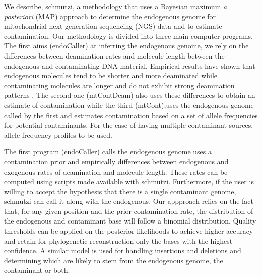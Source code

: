 \documentclass[a4paper,12pt]{article}
\begin{document}

We describe, schmutzi, a methodology that uses a Bayesian maximum {\it a posteriori} (MAP) approach to determine the endogenous genome for mitochondrial next-generation sequencing (NGS) data and to estimate contamination. Our methodology is divided into three main computer programs. The first aims (endoCaller) at inferring the endogenous genome, we rely on the differences between deamination rates and molecule length between the endogenous and contaminating DNA material. Empirical results have shown that endogenous molecules tend to be shorter and more deaminated while contaminating molecules are longer and do not exhibit strong deamination patterns \cite{meyer2013mitochondrial,garcia2011fragmentation}. The second one (mtContDeam) also uses these differences to obtain an estimate of contamination while the third (mtCont),uses the endogenous genome called by the first and estimates contamination based on a set of allele frequencies for potential contaminants. For the case of having multiple contaminant sources, allele frequency profiles to be used. 

The first program (endoCaller) calls the endogenous genome uses a contamination prior and empirically differences between endogenous and exogenous rates of deamination and molecule length. These rates can be computed using scripts made available with schmutzi. Furthermore, if the user is willing to accept the hypothesis that there is a single contaminant genome, schmutzi can call it along with the endogenous. Our appproach relies on the fact that, for any given position and the prior contamination rate, the distribution of the endogenous and contaminant base will follow a binomial distribution. Quality thresholds can be applied on the posterior likelihoods to achieve higher accuracy and retain for phylogenetic reconstruction only the bases with the highest confidence. A similar model is used for handling insertions and deletions and determining which are likely to stem from the endogenous genome, the contaminant or both. 
\end{document}
